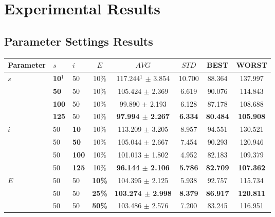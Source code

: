 \chapter{Experimental Results}
\label{appendixC}

\section{Parameter Settings Results}

\begin{table}
    \centering
    \begin{tabular}{|l|l|l|c||c|c|c|c|}
    \hline
    Parameter & $s$ & $i$ & $E$ & $AVG$ & $STD$ & BEST & WORST \\
    \hline
    $s$ & \textbf{10$^1$} & 50 & 10\% & 117.244$^1$ $\pm$ 3.854 & 10.700 & 88.364 & 137.997\\
    ~ & \textbf{50} & 50 & 10\% & 105.424 $\pm$ 2.369 & 6.619 & 90.076 & 114.843\\
    ~ & \textbf{100} & 50 & 10\% & 99.890 $\pm$ 2.193 & 6.128 & 87.178 & 108.688\\
    ~ & \textbf{125} & 50 & 10\% & \textbf{97.994 $\pm$ 2.267} & \textbf{6.334} & \textbf{80.484} & \textbf{105.908}\\
    \hline
    $i$ & 50 & \textbf{10} & 10\% & 113.209 $\pm$ 3.205 & 8.957 & 94.551 & 130.521\\
    ~ & 50 & \textbf{50} & 10\% & 105.044 $\pm$ 2.667 & 7.454 & 90.293 & 120.946\\
    ~ & 50 & \textbf{100} & 10\% & 101.013 $\pm$ 1.802 & 4.952 & 82.183 & 109.379\\
    ~ & 50 & \textbf{125} & 10\% & \textbf{96.144 $\pm$ 2.106} & \textbf{5.786} & \textbf{82.709} & \textbf{107.362}\\
    \hline
    $E$ & 50 & 50 & \textbf{10\%} & 104.395 $\pm$ 2.125 & 5.938 & 92.757 & 115.734\\
    ~ & 50 & 50 & \textbf{25\%} & \textbf{103.274 $\pm$ 2.998} & \textbf{8.379} & \textbf{86.917} & \textbf{120.811}\\
    ~ & 50 & 50 & \textbf{50\%} & 103.486 $\pm$ 2.576 & 7.200 & 83.245 & 116.951\\

\end{tabular}
\end{table}
